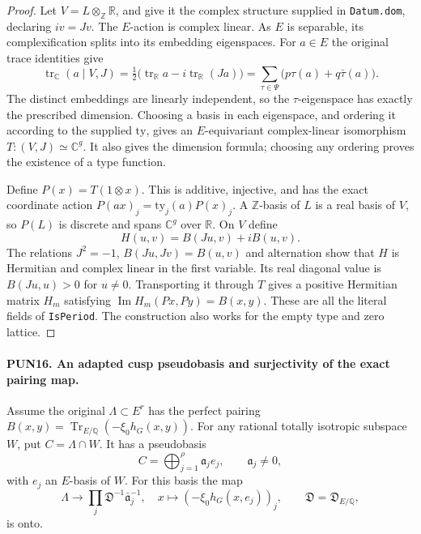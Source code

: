 \documentclass[11pt,a4paper]{article}
\numberwithin{equation}{section}
\theoremstyle{remark}\newtheorem{remark}[theorem]{Remark}
\begin{document}
\begin{proof}
Let \(V=L\otimes_{\mathbb Z}\mathbb R\), and give it the
complex structure supplied in \texttt{Datum.\allowbreak dom}, declaring
\(i v=Jv\).  The \(E\)-action is complex linear.  As \(E\)
is separable, its complexification splits into its embedding
eigenspaces.  For \(a\in E\) the original trace identities
give
\[
 \operatorname{tr}_{\mathbb C}(a\mid V,J)
 =\tfrac12\bigl(\operatorname{tr}_{\mathbb R}a
                  -i\operatorname{tr}_{\mathbb R}(Ja)\bigr)
 =\sum_{\tau\in\Psi}
                       \bigl(p\tau(a)+q\bar\tau(a)\bigr).
 \tag{PUN.17}
\]
The distinct embeddings are linearly independent, so the
\(\tau\)-eigenspace has exactly the prescribed dimension.
Choosing a basis in each eigenspace, and ordering it according
to the supplied \(\mathrm{ty}\), gives an \(E\)-equivariant
complex-linear isomorphism \(T:(V,J)\simeq\mathbb C^g\).
It also gives the dimension formula; choosing any ordering
proves the existence of a type function.

Define \(P(x)=T(1\otimes x)\).  This is additive, injective,
and has the exact coordinate action
\(P(ax)_j=\mathrm{ty}_j(a)P(x)_j\).  A \(\mathbb Z\)-basis
of \(L\) is a real basis of \(V\), so \(P(L)\) is discrete
and spans \(\mathbb C^g\) over \(\mathbb R\).
On \(V\) define
\[
                 H(u,v)=B(Ju,v)+iB(u,v).
 \tag{PUN.18}
\]
The relations \(J^2=-1\), \(B(Ju,Jv)=B(u,v)\) and
alternation show that \(H\) is Hermitian and complex linear
in the first variable.  Its real diagonal value is
\(B(Ju,u)>0\) for \(u\ne0\).  Transporting it through \(T\)
gives a positive Hermitian matrix \(H_m\) satisfying
\(\operatorname{Im}H_m(Px,Py)=B(x,y)\).  These are all the
literal fields of \texttt{Is\allowbreak Period}.  The construction also
works for the empty type and zero lattice.
\end{proof}

\paragraph{PUN16. An adapted cusp pseudobasis and surjectivity of the exact pairing map.}
\label{claim:PUN16}
Assume the original \(\Lambda\subset E^r\) has the perfect
pairing \(B(x,y)=\operatorname{Tr}_{E/\mathbb Q}(-\xi_0h_G(x,y))\).
For any rational totally isotropic subspace \(W\), put
\(C=\Lambda\cap W\).  It has a pseudobasis
\[
                    C=\bigoplus_{j=1}^{\rho}\mathfrak a_j e_j,
                    \qquad \mathfrak a_j\ne0,
 \tag{PUN.19}
\]
with \(e_j\) an \(E\)-basis of \(W\).  For this basis the
map
\[
 \Lambda\longrightarrow\prod_j
        \mathfrak D^{-1}\bar{\mathfrak a}_j^{-1},
 \quad x\longmapsto(-\xi_0h_G(x,e_j))_j,
 \qquad\mathfrak D=\mathfrak D_{E/\mathbb Q},
 \tag{PUN.20}
\]
is onto.
\end{document}
